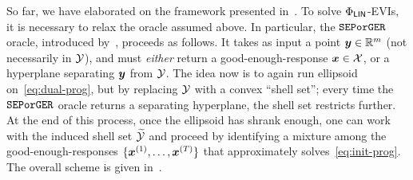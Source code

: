 So far, we have elaborated on the framework presented in~. To solve $\Phi_\mathsf{LIN}$-EVIs, it is necessary to relax the oracle assumed above. In particular, the $\mathtt{SEPorGER}$ oracle, introduced by~\citet{Daskalakis24:Lower}, proceeds as follows. It takes as input a point ${\bm{y}} \in \mathbb R^m$ (not necessarily in ${\mathcal{Y}}$), and must \emph{either} return a good-enough-response ${\bm{x}} \in {\mathcal{X}}$, or a hyperplane separating ${\bm{y}}$ from ${\mathcal{Y}}$. The idea now is to again run ellipsoid on~\eqref{eq:dual-prog}, but by replacing ${\mathcal{Y}}$ with a convex ``shell set''; every time the $\mathtt{SEPorGER}$ oracle returns a separating hyperplane, the shell set restricts further. At the end of this process, once the ellipsoid has shrank enough, one can work with the induced shell set $\widetilde{{\mathcal{Y}}}$ and proceed by identifying a mixture among the good-enough-responses $\{{\bm{x}}^{(1)}, \dots, {\bm{x}}^{(T)} \}$ that approximately solves~\eqref{eq:init-prog}. The overall scheme is given in~.

